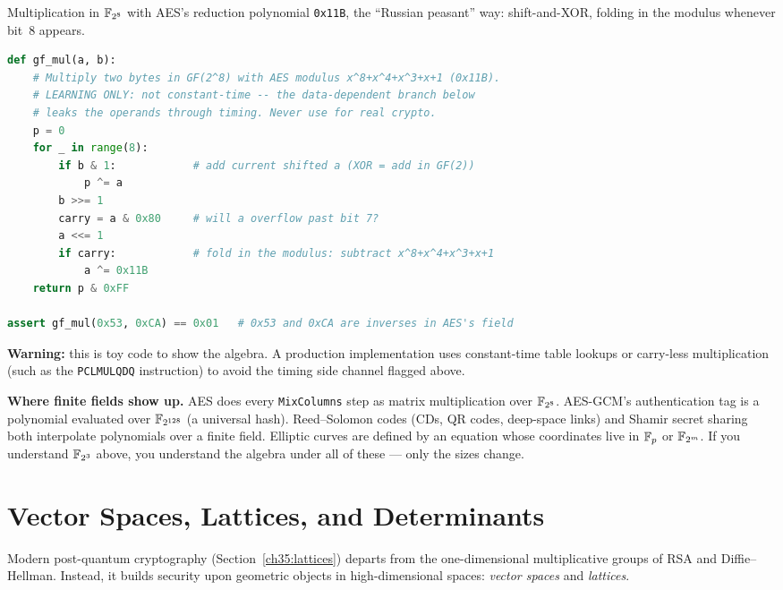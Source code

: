 \begin{implementbox}
Multiplication in $\mathbb{F}_{2^8}$ with AES's reduction polynomial \texttt{0x11B}, the
``Russian peasant'' way: shift-and-XOR, folding in the modulus whenever bit~$8$
appears.

\begin{lstlisting}[language=Python]
def gf_mul(a, b):
    # Multiply two bytes in GF(2^8) with AES modulus x^8+x^4+x^3+x+1 (0x11B).
    # LEARNING ONLY: not constant-time -- the data-dependent branch below
    # leaks the operands through timing. Never use for real crypto.
    p = 0
    for _ in range(8):
        if b & 1:            # add current shifted a (XOR = add in GF(2))
            p ^= a
        b >>= 1
        carry = a & 0x80     # will a overflow past bit 7?
        a <<= 1
        if carry:            # fold in the modulus: subtract x^8+x^4+x^3+x+1
            a ^= 0x11B
    return p & 0xFF

assert gf_mul(0x53, 0xCA) == 0x01   # 0x53 and 0xCA are inverses in AES's field
\end{lstlisting}
\textbf{Warning:} this is toy code to show the algebra. A production
implementation uses constant-time table lookups or carry-less multiplication (such as the \texttt{PCLMULQDQ} instruction) to avoid the timing side channel flagged above.
\end{implementbox}

\begin{applicationbox}
\textbf{Where finite fields show up.} AES does every \texttt{MixColumns} step as
matrix multiplication over $\mathbb{F}_{2^8}$. AES-GCM's authentication tag is a polynomial
evaluated over $\mathbb{F}_{2^{128}}$ (a universal hash). Reed--Solomon codes (CDs, QR
codes, deep-space links) and Shamir secret sharing both interpolate polynomials
over a finite field. Elliptic curves are defined by an equation whose coordinates
live in $\mathbb{F}_p$ or $\mathbb{F}_{2^m}$. If you understand $\mathbb{F}_{2^3}$ above, you understand
the algebra under all of these --- only the sizes change.
\end{applicationbox}

\section{Vector Spaces, Lattices, and Determinants}
\label{ch41:lattices}

Modern post-quantum cryptography (Section~\ref{ch35:lattices}) departs from the
one-dimensional multiplicative groups of RSA and Diffie--Hellman. Instead, it builds
security upon geometric objects in high-dimensional spaces: \emph{vector spaces} and
\emph{lattices}.

